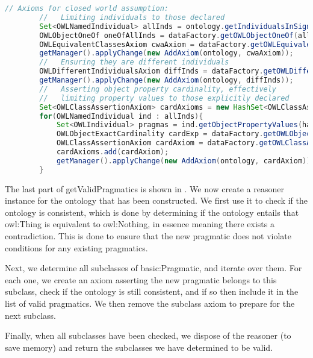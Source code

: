 	\begin{lstlisting}[language=Java,float,label=lst:validPragma3,
	caption=getValidPragmatics Part 3]
		// Axioms for closed world assumption: 
		//   Limiting individuals to those declared
		Set<OWLNamedIndividual> allInds = ontology.getIndividualsInSignature(); System.out.println(allInds.size());
		OWLObjectOneOf oneOfAllInds = dataFactory.getOWLObjectOneOf(allInds);
		OWLEquivalentClassesAxiom cwaAxiom = dataFactory.getOWLEquivalentClassesAxiom(dataFactory.getOWLThing(), oneOfAllInds);
		getManager().applyChange(new AddAxiom(ontology, cwaAxiom));
		//   Ensuring they are different individuals
		OWLDifferentIndividualsAxiom diffInds = dataFactory.getOWLDifferentIndividualsAxiom(allInds);
		getManager().applyChange(new AddAxiom(ontology, diffInds));
		//   Asserting object property cardinality, effectively
		//   limiting property values to those explicitly declared 
		Set<OWLClassAssertionAxiom> cardAxioms = new HashSet<OWLClassAssertionAxiom>();
		for(OWLNamedIndividual ind : allInds){
			Set<OWLIndividual> pragmas = ind.getObjectPropertyValues(hasPragmatic, ontology);
			OWLObjectExactCardinality cardExp = dataFactory.getOWLObjectExactCardinality(pragmas.size(), hasPragmatic);
			OWLClassAssertionAxiom cardAxiom = dataFactory.getOWLClassAssertionAxiom(cardExp, ind);
			cardAxioms.add(cardAxiom);
			getManager().applyChange(new AddAxiom(ontology, cardAxiom));
		}
	\end{lstlisting}
	
	The last part of getValidPragmatics is shown in
	. We now create a reasoner instance for the ontology that
	has been constructed. We first use it to check if the ontology is consistent,
	which is done by determining if the ontology entails that owl:Thing is
	equivalent to owl:Nothing, in essence meaning there exists a contradiction.
	This is done to ensure that the new pragmatic does not violate conditions for
	any existing pragmatics.
	
	Next, we determine all subclasses of basic:Pragmatic, and iterate over them.
	For each one, we create an axiom asserting the new pragmatic belongs to this
	subclass, check if the ontology is still consistent, and if so then include it
	in the list of valid pragmatics. We then remove the subclass axiom to prepare
	for the next subclass.
	
	Finally, when all subclasses have been checked, we dispose of the reasoner (to
	save memory) and return the subclasses we have determined to be valid.
	
